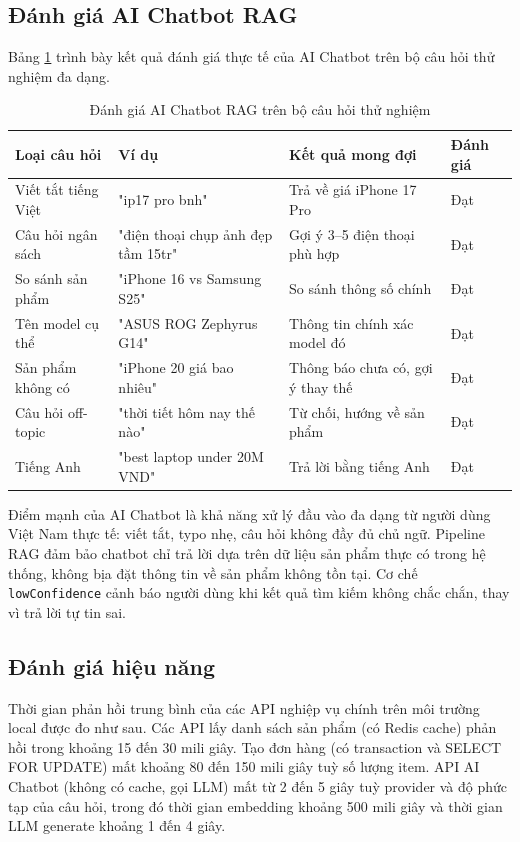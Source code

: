 \subsection{Đánh giá AI Chatbot RAG}

Bảng \ref{tab:chatbot-eval} trình bày kết quả đánh giá thực tế của AI Chatbot trên bộ câu hỏi thử nghiệm đa dạng.

\begin{table}[H]
\centering
\caption{Đánh giá AI Chatbot RAG trên bộ câu hỏi thử nghiệm}
\label{tab:chatbot-eval}
\begin{tabular}{|p{4cm}|p{4cm}|p{2.5cm}|p{2cm}|}
\hline
\textbf{Loại câu hỏi} & \textbf{Ví dụ} & \textbf{Kết quả mong đợi} & \textbf{Đánh giá} \\
\hline
Viết tắt tiếng Việt & "ip17 pro bnh" & Trả về giá iPhone 17 Pro & Đạt \\
\hline
Câu hỏi ngân sách & "điện thoại chụp ảnh đẹp tầm 15tr" & Gợi ý 3--5 điện thoại phù hợp & Đạt \\
\hline
So sánh sản phẩm & "iPhone 16 vs Samsung S25" & So sánh thông số chính & Đạt \\
\hline
Tên model cụ thể & "ASUS ROG Zephyrus G14" & Thông tin chính xác model đó & Đạt \\
\hline
Sản phẩm không có & "iPhone 20 giá bao nhiêu" & Thông báo chưa có, gợi ý thay thế & Đạt \\
\hline
Câu hỏi off-topic & "thời tiết hôm nay thế nào" & Từ chối, hướng về sản phẩm & Đạt \\
\hline
Tiếng Anh & "best laptop under 20M VND" & Trả lời bằng tiếng Anh & Đạt \\
\hline
\end{tabular}
\end{table}

Điểm mạnh của AI Chatbot là khả năng xử lý đầu vào đa dạng từ người dùng Việt Nam thực tế: viết tắt, typo nhẹ, câu hỏi không đầy đủ chủ ngữ. Pipeline RAG đảm bảo chatbot chỉ trả lời dựa trên dữ liệu sản phẩm thực có trong hệ thống, không bịa đặt thông tin về sản phẩm không tồn tại. Cơ chế \texttt{lowConfidence} cảnh báo người dùng khi kết quả tìm kiếm không chắc chắn, thay vì trả lời tự tin sai.

\subsection{Đánh giá hiệu năng}

Thời gian phản hồi trung bình của các API nghiệp vụ chính trên môi trường local được đo như sau. Các API lấy danh sách sản phẩm (có Redis cache) phản hồi trong khoảng 15 đến 30 mili giây. Tạo đơn hàng (có transaction và SELECT FOR UPDATE) mất khoảng 80 đến 150 mili giây tuỳ số lượng item. API AI Chatbot (không có cache, gọi LLM) mất từ 2 đến 5 giây tuỳ provider và độ phức tạp của câu hỏi, trong đó thời gian embedding khoảng 500 mili giây và thời gian LLM generate khoảng 1 đến 4 giây.

